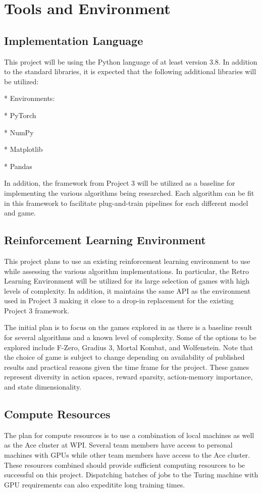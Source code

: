\documentclass[conference]{IEEEtran}
\begin{document}
\section{Tools and Environment}

\subsection{Implementation Language}
This project will be using the Python language of at least version 3.8.
In addition to the standard libraries, it is expected that the following additional libraries will be utilized:

* Environments: \cite{bhonker2017playing}

* PyTorch

* NumPy

* Matplotlib

* Pandas

In addition, the framework from Project 3 will be utilized as a baseline for implementing the various algorithms being researched. Each algorithm can be fit in this framework to facilitate plug-and-train pipelines for each different model and game.

\subsection{Reinforcement Learning Environment}
This project plans to use an existing reinforcement learning environment to use while assessing the various algorithm implementations.
In particular, the Retro Learning Environment \cite{bhonker2017playing} will be utilized for its large selection of games with high levels of complexity.
In addition, it maintains the same API as the environment used in Project 3 making it close to a drop-in replacement for the existing Project 3 framework.

The initial plan is to focus on the games explored in \cite{bhonker2017playing} as there is a baseline result for several algorithms and a known level of complexity.
Some of the options to be explored include F-Zero, Gradius 3, Mortal Kombat, and Wolfenstein.
Note that the choice of game is subject to change depending on availability of published results and practical reasons given the time frame for the project.
These games represent diversity in action spaces, reward sparsity, action-memory importance, and state dimensionality.

\subsection{Compute Resources}
The plan for compute resources is to use a combination of local machines as well as the Ace cluster at WPI.
Several team members have access to personal machines with GPUs while other team members have access to the Ace cluster.
These resources combined should provide sufficient computing resources to be successful on this project.
Dispatching batches of jobs to the Turing machine with GPU requirements can also expeditite long training times.
\end{document}
